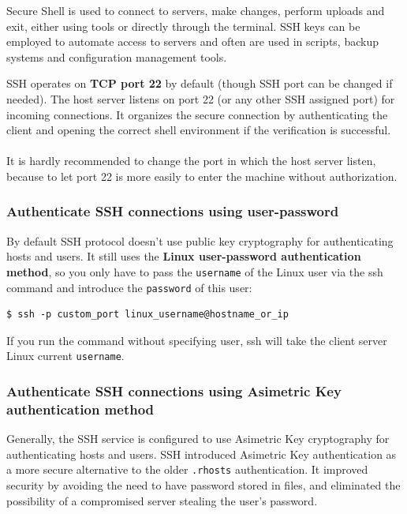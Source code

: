 \documentclass{article}
\newenvironment{blocktemplate}[1]{%
    \tcolorbox[beamer,%
    noparskip,breakable,
    colframe=Blue,%
    colbacklower=LimeGreen!75!LightGreen,%
    title=#1]}%
    {\endtcolorbox}
\newenvironment{blocktemplateI}[1]{%
    \tcolorbox[beamer,%
    noparskip,breakable,
    colframe=Violet,%
    colbacklower=Black,%
    title=#1]}%
    {\endtcolorbox}
\newenvironment{codetemplate}[1][]{%
  \mybasecolorbox[#1]
  \itshape
}{%
  \endmybasecolorbox
}
\begin{document}
Secure Shell is used to connect to servers, make changes, perform uploads and exit, either using tools or directly through the terminal. SSH keys can be employed to automate access to servers and often are used in scripts, backup systems and configuration management tools.

\begin{blocktemplateI}{Note}

SSH operates on \textbf{TCP port 22} by default (though SSH port can be changed if needed). The host server listens on port 22 (or any other SSH assigned port) for incoming connections. It organizes the secure connection by authenticating the client and opening the correct shell environment if the verification is successful.
\\\\
It is hardly recommended to change the port in which the host server listen, because to let port 22 is more easily to enter the machine without authorization.
\end{blocktemplateI}

\subsubsection{Authenticate SSH connections using user-password}

By default SSH protocol doesn't use public key cryptography for authenticating hosts and users. It still uses the \textbf{Linux user-password authentication method}, so you only have to pass the \verb|username| of the Linux user via the ssh command and introduce the \verb|password| of this user:

\begin{codetemplate}{}
\begin{verbatim}
$ ssh -p custom_port linux_username@hostname_or_ip
\end{verbatim}
\end{codetemplate}

\begin{blocktemplate}{Note}
 If you run the command without specifying user, ssh will take the client server Linux current \verb|username|.
\end{blocktemplate}

\subsubsection{Authenticate SSH connections using Asimetric Key authentication method}

Generally, the SSH service is configured to use Asimetric Key cryptography for authenticating hosts and users. SSH introduced Asimetric Key authentication as a more secure alternative to the older \verb|.rhosts| authentication. It improved security by avoiding the need to have password stored in files, and eliminated the possibility of a compromised server stealing the user's password.
\end{document}
